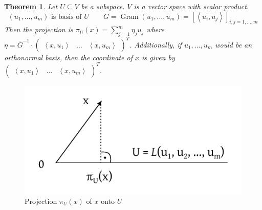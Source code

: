 \documentclass[a4paper]{article}
\newcounter{lecref}[section]
\numberwithin{lecref}{section}
\newtheorem{theorem}[lecref]{Theorem}
\newcommand{\ip}[2]{\left\langle#1,#2\right\rangle} %
\begin{document}
\begin{theorem} %
  Let $U \subseteq V$ be a subspace. $V$ is a vector space with scalar product.
  \[ (u_1, \ldots, u_m) \text{ is basis of } U \qquad
     G = \operatorname{Gram}(u_1, \ldots, u_m) = \left[\ip{u_i}{u_j}\right]_{i,j=1,\ldots,m} \]
  Then the projection is $\pi_U(x) = \sum_{j=1}^m \eta_j u_j$ where
  $ \eta = \overline{G}^{-1} \cdot \begin{pmatrix} \ip{x}{u_1} & \dots & \ip{x}{u_m} \end{pmatrix}^T $.
  Additionally, if $u_1, \ldots, u_m$ would be an orthonormal basis, then the coordinate of $x$ is given by
  $ \begin{pmatrix} \ip{x}{u_1} & \dots & \ip{x}{u_m} \end{pmatrix}^T $.
\end{theorem}

\begin{figure}[t]
  \begin{center}
    \includegraphics{img/11_projection.pdf}
    \caption{Projection $\pi_U(x)$ of $x$ onto $U$}
    \label{img:projection}
  \end{center}
\end{figure}
\end{document}

